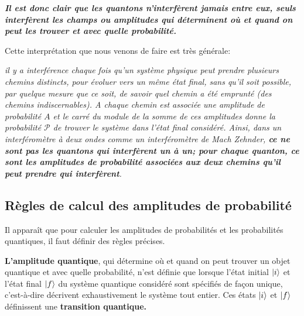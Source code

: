 \emph{\textbf{Il est donc clair que les quantons n'interfèrent jamais entre eux,
seuls interfèrent les champs ou amplitudes qui déterminent où et quand on peut
les trouver et avec quelle probabilité.}}

Cette interprétation que nous venons de faire est très générale:

\medskip
\colorbox[gray]{0.8}{
\parbox[c]{0.9\textwidth}{
\emph{il y a interférence chaque fois qu'un système physique peut prendre
plusieurs chemins distincts, pour évoluer vers un même état final, sans qu'il
soit possible, par quelque mesure que ce soit, de savoir quel chemin a été
emprunté (des chemins indiscernables). A chaque chemin est associée une
amplitude de probabilité $A$ et le carré du module de la somme de ces amplitudes
donne la probabilité $\mathcal{P}$ de trouver le système dans l'état final
considéré. Ainsi, dans un interféromètre à deux ondes comme un interféromètre de
Mach Zehnder, \textbf{ce ne sont pas les quantons qui interfèrent un à un; pour
chaque quanton, ce sont les amplitudes de probabilité associées aux deux chemins
qu'il peut prendre qui interfèrent}.}
}}

\subsection{Règles de calcul des amplitudes de probabilité}

Il apparaît que pour calculer les amplitudes de probabilités et les
probabilités quantiques, il faut définir des règles précises.

\colorbox[gray]{0.8}{
\parbox[c]{0.9\textwidth}{
\begin{definition}
\textbf{L'amplitude quantique}, qui détermine où et quand on peut trouver un
objet quantique et avec quelle probabilité, n'est définie que lorsque l'état
initial $\vert i\rangle$ et l'état final $\vert f\rangle$ du système quantique considéré sont
spécifiés de façon unique, c'est-à-dire décrivent exhaustivement le système tout
entier. Ces états $\vert i\rangle$ et $\vert f\rangle$ définissent une \textbf{transition
quantique.}
\end{definition}
}}

